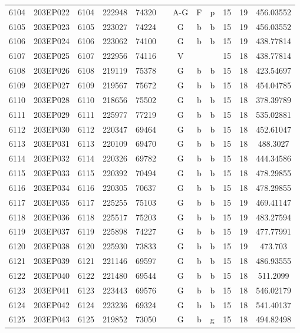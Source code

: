 \begin{tabular}{|*{12}{c|}}
6104 & 203EP022 & 6104 & 222948 & 74320 &  & A-G & F & p & 15 & 19 & 456.03552 \\ 
6105 & 203EP023 & 6105 & 223027 & 74224 &  & G & b & b & 15 & 19 & 456.03552 \\ 
6106 & 203EP024 & 6106 & 223062 & 74100 &  & G & b & b & 15 & 19 & 438.77814 \\ 
6107 & 203EP025 & 6107 & 222956 & 74116 &  & V &  &  & 15 & 18 & 438.77814 \\ 
6108 & 203EP026 & 6108 & 219119 & 75378 &  & G & b & b & 15 & 18 & 423.54697 \\ 
6109 & 203EP027 & 6109 & 219567 & 75672 &  & G & b & b & 15 & 18 & 454.04785 \\ 
6110 & 203EP028 & 6110 & 218656 & 75502 &  & G & b & b & 15 & 18 & 378.39789 \\ 
6111 & 203EP029 & 6111 & 225977 & 77219 &  & G & b & b & 15 & 18 & 535.02881 \\ 
6112 & 203EP030 & 6112 & 220347 & 69464 &  & G & b & b & 15 & 18 & 452.61047 \\ 
6113 & 203EP031 & 6113 & 220109 & 69470 &  & G & b & b & 15 & 18 & 488.3027 \\ 
6114 & 203EP032 & 6114 & 220326 & 69782 &  & G & b & b & 15 & 18 & 444.34586 \\ 
6115 & 203EP033 & 6115 & 220392 & 70494 &  & G & b & b & 15 & 18 & 478.29855 \\ 
6116 & 203EP034 & 6116 & 220305 & 70637 &  & G & b & b & 15 & 18 & 478.29855 \\ 
6117 & 203EP035 & 6117 & 225255 & 75103 &  & G & b & b & 15 & 19 & 469.41147 \\ 
6118 & 203EP036 & 6118 & 225517 & 75203 &  & G & b & b & 15 & 19 & 483.27594 \\ 
6119 & 203EP037 & 6119 & 225898 & 74227 &  & G & b & b & 15 & 19 & 477.77991 \\ 
6120 & 203EP038 & 6120 & 225930 & 73833 &  & G & b & b & 15 & 19 & 473.703 \\ 
6121 & 203EP039 & 6121 & 221146 & 69597 &  & G & b & b & 15 & 18 & 486.93555 \\ 
6122 & 203EP040 & 6122 & 221480 & 69544 &  & G & b & b & 15 & 18 & 511.2099 \\ 
6123 & 203EP041 & 6123 & 223443 & 69576 &  & G & b & b & 15 & 18 & 546.02179 \\ 
6124 & 203EP042 & 6124 & 223236 & 69324 &  & G & b & b & 15 & 18 & 541.40137 \\ 
6125 & 203EP043 & 6125 & 219852 & 73050 &  & G & b & g & 15 & 18 & 494.82498 \\ 

\end{tabular}
